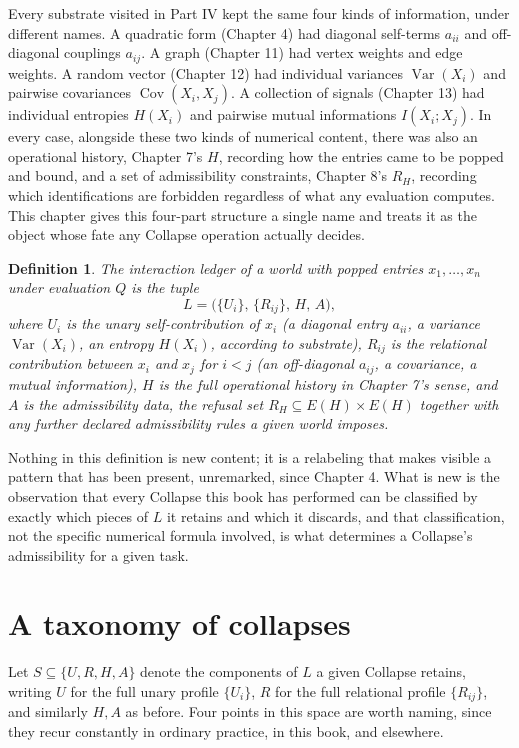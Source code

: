 \documentclass[11pt]{book}
\newtheorem{definition}[theorem]{Definition}
\begin{document}
Every substrate visited in Part IV kept the same four kinds of information, under different names. A quadratic form (Chapter 4) had diagonal self-terms $a_{ii}$ and off-diagonal couplings $a_{ij}$. A graph (Chapter 11) had vertex weights and edge weights. A random vector (Chapter 12) had individual variances $\operatorname{Var}(X_i)$ and pairwise covariances $\operatorname{Cov}(X_i,X_j)$. A collection of signals (Chapter 13) had individual entropies $H(X_i)$ and pairwise mutual informations $I(X_i;X_j)$. In every case, alongside these two kinds of numerical content, there was also an operational history, Chapter 7's $H$, recording how the entries came to be popped and bound, and a set of admissibility constraints, Chapter 8's $R_H$, recording which identifications are forbidden regardless of what any evaluation computes. This chapter gives this four-part structure a single name and treats it as the object whose fate any Collapse operation actually decides.

\begin{definition}
The \emph{interaction ledger} of a world with popped entries $x_1,\ldots,x_n$ under evaluation $Q$ is the tuple
\[
L = \bigl(\{U_i\},\, \{R_{ij}\},\, H,\, A\bigr),
\]
where $U_i$ is the unary self-contribution of $x_i$ (a diagonal entry $a_{ii}$, a variance $\operatorname{Var}(X_i)$, an entropy $H(X_i)$, according to substrate), $R_{ij}$ is the relational contribution between $x_i$ and $x_j$ for $i<j$ (an off-diagonal $a_{ij}$, a covariance, a mutual information), $H$ is the full operational history in Chapter 7's sense, and $A$ is the admissibility data, the refusal set $R_H\subseteq E(H)\times E(H)$ together with any further declared admissibility rules a given world imposes.
\end{definition}

Nothing in this definition is new content; it is a relabeling that makes visible a pattern that has been present, unremarked, since Chapter 4. What is new is the observation that every Collapse this book has performed can be classified by exactly which pieces of $L$ it retains and which it discards, and that classification, not the specific numerical formula involved, is what determines a Collapse's admissibility for a given task.

\section{A taxonomy of collapses}

Let $S\subseteq\{U,R,H,A\}$ denote the components of $L$ a given Collapse retains, writing $U$ for the full unary profile $\{U_i\}$, $R$ for the full relational profile $\{R_{ij}\}$, and similarly $H,A$ as before. Four points in this space are worth naming, since they recur constantly in ordinary practice, in this book, and elsewhere.
\end{document}
